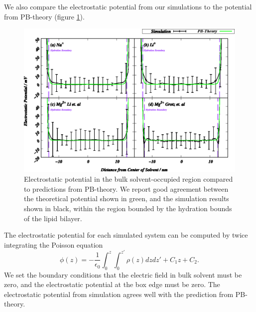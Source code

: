 \documentclass[12pt,openany,final]{book}
\begin{document}
We also compare {the} 
electrostatic potential from our simulations 
to the potential from PB-theory 
(figure \ref{fig:potgc:ch2}). 
\begin{figure}
    \caption[Electrostatic potential in bulk solvent]{Electrostatic potential in the bulk solvent-occupied region compared to predictions from PB-theory. We report good
    agreement between the theoretical potential shown in green, and the simulation results shown in black, within the region bounded by the hydration
    bounds of the lipid bilayer.}
    \label{fig:potgc:ch2}
    \includegraphics[width=\textwidth]{Figure_6_ch2.eps}
\end{figure}
The electrostatic potential for each simulated system can be computed 
by twice integrating the Poisson equation 
\begin{equation}
    \phi(z)=-\frac{1}{\epsilon_0}\int_{0}^{z}\int_{0}^{z'}\rho(z) dz dz' + C_1z + C_2\text{.}
    \label{eq:poissonint}
\end{equation}
We set the boundary conditions that
the electric field in bulk solvent must be zero, and the electrostatic potential at the box edge must be zero.
The electrostatic potential from simulation agrees well with the prediction from PB-theory.
\end{document}

